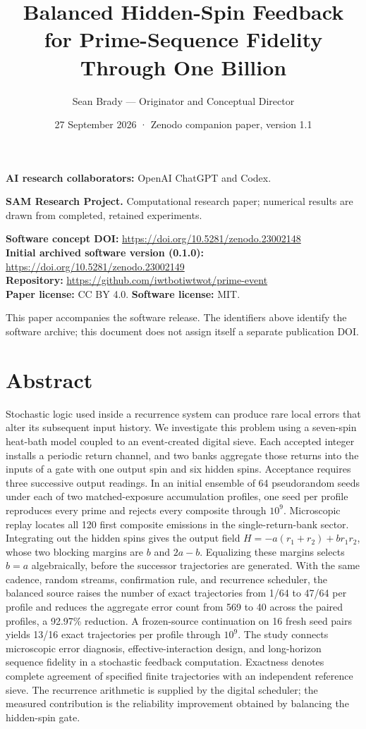\documentclass[
  11pt,
]{article}
\title{Balanced Hidden-Spin Feedback for Prime-Sequence Fidelity Through
One Billion}
\author{Sean Brady --- Originator and Conceptual Director}
\date{27 September 2026 · Zenodo companion paper, version 1.1}
\begin{document}
\maketitle

\textbf{AI research collaborators:} OpenAI ChatGPT and Codex.

\textbf{SAM Research Project.} Computational research paper; numerical
results are drawn from completed, retained experiments.

\textbf{Software concept DOI:}
\url{https://doi.org/10.5281/zenodo.23002148}\\
\textbf{Initial archived software version (0.1.0):}
\url{https://doi.org/10.5281/zenodo.23002149}\\
\textbf{Repository:} \url{https://github.com/iwtbotiwtwot/prime-event}\\
\textbf{Paper license:} CC BY 4.0. \textbf{Software license:} MIT.

This paper accompanies the software release. The identifiers above
identify the software archive; this document does not assign itself a
separate publication DOI.

\section{Abstract}\label{abstract}

Stochastic logic used inside a recurrence system can produce rare local
errors that alter its subsequent input history. We investigate this
problem using a seven-spin heat-bath model coupled to an event-created
digital sieve. Each accepted integer installs a periodic return channel,
and two banks aggregate those returns into the inputs of a gate with one
output spin and six hidden spins. Acceptance requires three successive
output readings. In an initial ensemble of 64 pseudorandom seeds under
each of two matched-exposure accumulation profiles, one seed per profile
reproduces every prime and rejects every composite through \(10^9\).
Microscopic replay locates all 120 first composite emissions in the
single-return-bank sector. Integrating out the hidden spins gives the
output field \(H=-a(r_1+r_2)+br_1r_2\), whose two blocking margins are
\(b\) and \(2a-b\). Equalizing these margins selects \(b=a\)
algebraically, before the successor trajectories are generated. With the
same cadence, random streams, confirmation rule, and recurrence
scheduler, the balanced source raises the number of exact trajectories
from 1/64 to 47/64 per profile and reduces the aggregate error count
from 569 to 40 across the paired profiles, a 92.97\% reduction. A
frozen-source continuation on 16 fresh seed pairs yields 13/16 exact
trajectories per profile through \(10^9\). The study connects
microscopic error diagnosis, effective-interaction design, and
long-horizon sequence fidelity in a stochastic feedback computation.
Exactness denotes complete agreement of specified finite trajectories
with an independent reference sieve. The recurrence arithmetic is
supplied by the digital scheduler; the measured contribution is the
reliability improvement obtained by balancing the hidden-spin gate.
\end{document}
